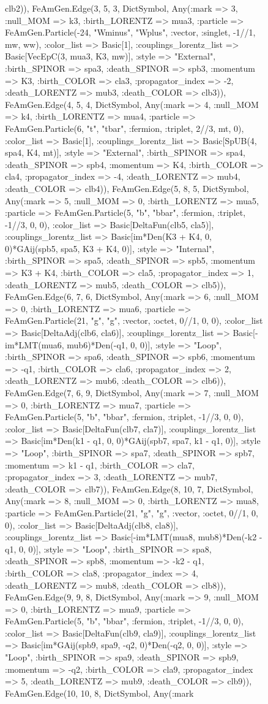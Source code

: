 \documentclass{revtex4}
\begin{document}
\begin{figure}[!htb]
\begin{center}
{clb2)), FeAmGen.Edge(3, 5, 3, Dict{Symbol, Any}(:mark => 3, :null_MOM => k3, :birth_LORENTZ => mua3, :particle => FeAmGen.Particle(-24, "Wminus", "Wplus", :vector, :singlet, -1//1, mw, ww), :color_list => Basic[1], :couplings_lorentz_list => Basic[VecEpC(3, mua3, K3, mw)], :style => "External", :birth_SPINOR => spa3, :death_SPINOR => spb3, :momentum => K3, :birth_COLOR => cla3, :propagator_index => -2, :death_LORENTZ => mub3, :death_COLOR => clb3)), FeAmGen.Edge(4, 5, 4, Dict{Symbol, Any}(:mark => 4, :null_MOM => k4, :birth_LORENTZ => mua4, :particle => FeAmGen.Particle(6, "t", "tbar", :fermion, :triplet, 2//3, mt, 0), :color_list => Basic[1], :couplings_lorentz_list => Basic[SpUB(4, spa4, K4, mt)], :style => "External", :birth_SPINOR => spa4, :death_SPINOR => spb4, :momentum => K4, :birth_COLOR => cla4, :propagator_index => -4, :death_LORENTZ => mub4, :death_COLOR => clb4)), FeAmGen.Edge(5, 8, 5, Dict{Symbol, Any}(:mark => 5, :null_MOM => 0, :birth_LORENTZ => mua5, :particle => FeAmGen.Particle(5, "b", "bbar", :fermion, :triplet, -1//3, 0, 0), :color_list => Basic[DeltaFun(clb5, cla5)], :couplings_lorentz_list => Basic[im*Den(K3 + K4, 0, 0)*GAij(spb5, spa5, K3 + K4, 0)], :style => "Internal", :birth_SPINOR => spa5, :death_SPINOR => spb5, :momentum => K3 + K4, :birth_COLOR => cla5, :propagator_index => 1, :death_LORENTZ => mub5, :death_COLOR => clb5)), FeAmGen.Edge(6, 7, 6, Dict{Symbol, Any}(:mark => 6, :null_MOM => 0, :birth_LORENTZ => mua6, :particle => FeAmGen.Particle(21, "g", "g", :vector, :octet, 0//1, 0, 0), :color_list => Basic[DeltaAdj(clb6, cla6)], :couplings_lorentz_list => Basic[-im*LMT(mua6, mub6)*Den(-q1, 0, 0)], :style => "Loop", :birth_SPINOR => spa6, :death_SPINOR => spb6, :momentum => -q1, :birth_COLOR => cla6, :propagator_index => 2, :death_LORENTZ => mub6, :death_COLOR => clb6)), FeAmGen.Edge(7, 6, 9, Dict{Symbol, Any}(:mark => 7, :null_MOM => 0, :birth_LORENTZ => mua7, :particle => FeAmGen.Particle(5, "b", "bbar", :fermion, :triplet, -1//3, 0, 0), :color_list => Basic[DeltaFun(clb7, cla7)], :couplings_lorentz_list => Basic[im*Den(k1 - q1, 0, 0)*GAij(spb7, spa7, k1 - q1, 0)], :style => "Loop", :birth_SPINOR => spa7, :death_SPINOR => spb7, :momentum => k1 - q1, :birth_COLOR => cla7, :propagator_index => 3, :death_LORENTZ => mub7, :death_COLOR => clb7)), FeAmGen.Edge(8, 10, 7, Dict{Symbol, Any}(:mark => 8, :null_MOM => 0, :birth_LORENTZ => mua8, :particle => FeAmGen.Particle(21, "g", "g", :vector, :octet, 0//1, 0, 0), :color_list => Basic[DeltaAdj(clb8, cla8)], :couplings_lorentz_list => Basic[-im*LMT(mua8, mub8)*Den(-k2 - q1, 0, 0)], :style => "Loop", :birth_SPINOR => spa8, :death_SPINOR => spb8, :momentum => -k2 - q1, :birth_COLOR => cla8, :propagator_index => 4, :death_LORENTZ => mub8, :death_COLOR => clb8)), FeAmGen.Edge(9, 9, 8, Dict{Symbol, Any}(:mark => 9, :null_MOM => 0, :birth_LORENTZ => mua9, :particle => FeAmGen.Particle(5, "b", "bbar", :fermion, :triplet, -1//3, 0, 0), :color_list => Basic[DeltaFun(clb9, cla9)], :couplings_lorentz_list => Basic[im*GAij(spb9, spa9, -q2, 0)*Den(-q2, 0, 0)], :style => "Loop", :birth_SPINOR => spa9, :death_SPINOR => spb9, :momentum => -q2, :birth_COLOR => cla9, :propagator_index => 5, :death_LORENTZ => mub9, :death_COLOR => clb9)), FeAmGen.Edge(10, 10, 8, Dict{Symbol, Any}(:mark }
\end{center}
\end{figure}
\end{document}
